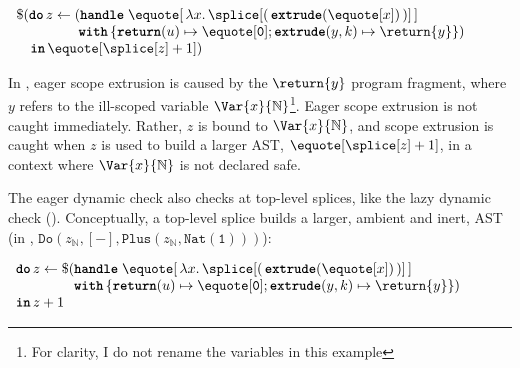 \begin{code} 
 \begin{source}
  $\begin{array}{l}
      \$(\textbf{\texttt{do}} \, z \leftarrow (\textbf{\texttt{handle}} \; \equote[{\, \lambda x. \,\splice[({{\, \textbf{\texttt{extrude}}(\equote[x]) \,}})]\,}] \\
      \quad\quad\quad\quad\,\; \textbf{\texttt{with}} \, \{ \textbf{\texttt{return}}(u) \mapsto {\equote[\texttt{0}]}; \textbf{\texttt{extrude}}(y, k) \mapsto {\return{y}}\})\\
      \quad \textbf{\texttt{in}} \, \equote[{\splice[z] + 1}])
    \end{array}$
 \end{source}
 \label{listing:eager-scope-extrusion-check-eg}
\end{code}

In , eager scope extrusion is caused by the $\return{y}$ program fragment, where $y$ refers to the ill-scoped variable $\Var{x}{\mathbb{N}}$\footnote{For clarity, I do not rename the variables in this example}. Eager scope extrusion is not caught immediately. Rather, $z$ is bound to $\Var{x}{\mathbb{N}}$, and scope extrusion is caught when $z$ is used to build a larger AST, $\equote[{\splice[z]+1}]$, in a context where $\Var{x}{\mathbb{N}}$ is not declared safe. 

The eager dynamic check also checks at top-level splices, like the lazy dynamic check (). Conceptually, a top-level splice builds a larger, ambient and inert, AST (in , $\texttt{Do}(z_\mathbb{N}, [-], \texttt{Plus}(z_\mathbb{N}, \texttt{Nat}(\texttt{1})))$):

\begin{code} 
 \begin{source}
  $\begin{array}{l}
      \textbf{\texttt{do}} \, z \leftarrow \$(\textbf{\texttt{handle}} \; \equote[{\, \lambda x. \,\splice[(\,{{ \textbf{\texttt{extrude}}(\equote[x])}}\,)] \,}] \\
      \quad\quad\quad\quad\,\textbf{\texttt{with}} \, \{ \textbf{\texttt{return}}(u) \mapsto {\equote[\texttt{0}]}; \textbf{\texttt{extrude}}(y, k) \mapsto {\return{y}}\})\\
      \textbf{\texttt{in}} \, z + 1
    \end{array}$
 \end{source}
 \label{listing:eager-scope-extrusion-check-eg-tls}
\end{code}

